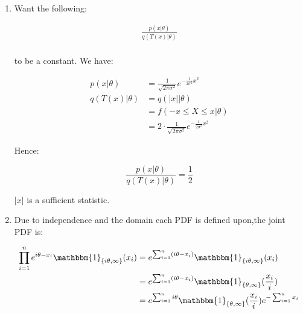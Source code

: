 \documentclass[11pt,letterpaper,titlepage]{article}
\begin{document}
\begin{enumerate}
    
    \item %
    
    Want the following:
    
    \begin{equation*}
        \begin{aligned}
            \frac{p(x | \theta)}{q(T(x) | \theta)} \\
        \end{aligned}
    \end{equation*}
    
    to be a constant. We have:
    
    \begin{equation*}
        \begin{aligned}
            p(x | \theta) &= \frac{1}{\sqrt{2 \pi \sigma^2}} e^{- \frac{1}{2 \sigma^2} x^2} \\
            q(T(x) | \theta) &= q(|x| | \theta) \\
            &= f(-x \leq X \leq x | \theta) \\
            &= 2 \cdot \frac{1}{\sqrt{2 \pi \sigma^2}} e^{- \frac{1}{2 \sigma^2} x^2}
        \end{aligned}
    \end{equation*}
    
    Hence:
    
    \begin{equation*}
        \frac{p(x | \theta)}{q(T(x) | \theta)} = \frac{1}{2}
    \end{equation*}
    
    $|x|$ is a sufficient statistic.
    
    \item %
    
    Due to independence and the domain each PDF is defined upon,the joint PDF is:
    
    \begin{equation*}
        \begin{aligned}
            \prod_{i=1}^{n} e^{i \theta - x_i} \mathbbm{1}_{\{i \theta, \infty\}}(x_i) &= e^{\sum_{i = 1}^{n} (i \theta - x_i)}\mathbbm{1}_{\{i \theta, \infty\}}(x_i) \\
            &= e^{\sum_{i = 1}^{n} (i \theta - x_i)} \mathbbm{1}_{\{ \theta, \infty\}}(\frac{x_i}{i}) \\
            &= e^{\sum_{i = 1}^{n}i \theta} \mathbbm{1}_{\{ \theta, \infty\}}(\frac{x_i}{i}) e^{- \sum_{i = 1}^{n} x_i} 
        \end{aligned}
    \end{equation*}
    

\end{enumerate}
\end{document}
